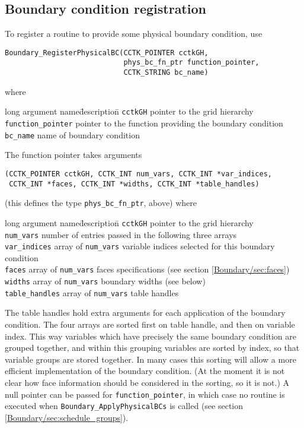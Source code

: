 \documentclass{article}
\begin{document}
\subsection{Boundary condition registration}
\label{Boundary/sec:bc_registration}

To register a routine to provide some physical boundary condition, use
\begin{verbatim}
Boundary_RegisterPhysicalBC(CCTK_POINTER cctkGH, 
                            phys_bc_fn_ptr function_pointer, 
                            CCTK_STRING bc_name)
\end{verbatim}
where
\begin{tabbing}
long argument name\= description\=\kill
\texttt{cctkGH} \> pointer to the grid hierarchy\\
\texttt{function\_pointer} \> pointer to the function providing the
boundary condition\\
\texttt{bc\_name} \> name of boundary condition
\end{tabbing}
The function pointer takes arguments
\begin{verbatim}
(CCTK_POINTER cctkGH, CCTK_INT num_vars, CCTK_INT *var_indices, 
 CCTK_INT *faces, CCTK_INT *widths, CCTK_INT *table_handles)
\end{verbatim}
(this defines the type \texttt{phys\_bc\_fn\_ptr}, above) where
\begin{tabbing}
long argument name\= description\=\kill
\texttt{cctkGH} \> pointer to the grid hierarchy\\
\texttt{num\_vars} \> number of entries passed in the following three arrays\\
\texttt{var\_indices} \> array of \texttt{num\_vars} variable indices selected for this boundary condition\\
\texttt{faces} \> array of \texttt{num\_vars} faces specifications
(see section \ref{Boundary/sec:faces})\\
\texttt{widths} \> array of \texttt{num\_vars} boundary widths (see below)\\
\texttt{table\_handles} \> array of \texttt{num\_vars} table handles%
\end{tabbing}
The table handles hold extra arguments for each application of the boundary condition.
The four arrays are sorted first on table handle, and then on
variable index.  This way variables which have precisely the same
boundary condition are grouped together, and within this grouping
variables are sorted by index, so that variable groups are stored
together.  In many cases this sorting will allow a more efficient
implementation of the boundary condition.  (At the moment it is not
clear how face information should be considered in the sorting, so it
is not.)  A null pointer can be passed for \texttt{function\_pointer},
in which case no routine is executed when
\texttt{Boundary\_ApplyPhysicalBCs} is called (see section
\ref{Boundary/sec:schedule_groups}).
\end{document}
